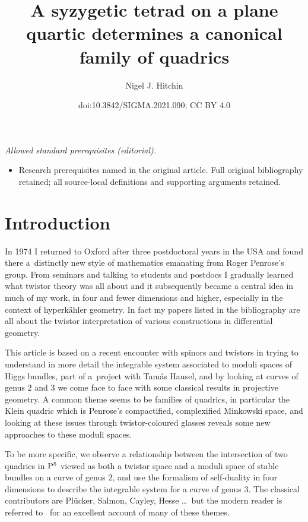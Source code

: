 \documentclass[10pt,a4paper]{amsart}
\title{A syzygetic tetrad on a plane quartic determines a canonical family of quadrics}
\author{Nigel J. Hitchin}
\date{doi:10.3842/SIGMA.2021.090; CC BY 4.0}
\numberwithin{equation}{section}
\begin{document}
\maketitle
\noindent\textit{Allowed standard prerequisites (editorial).}\begin{itemize}
\item Research prerequisites named in the original article. Full original bibliography retained; all source-local definitions and supporting arguments retained.
\end{itemize}\medskip
\section{Introduction}

In 1974 I returned to Oxford after three postdoctoral years in the USA and found there a~distinctly new style of mathematics emanating from Roger Penrose's group. From seminars and talking to students and postdocs I gradually learned what twistor theory was all about and it subsequently became a central idea
in much of my work, in four and fewer dimensions and higher, especially in the context of hyperk\"ahler geometry. In fact my papers listed in the bibliography \cite{Hitchin1979,Hitchin1981,Hitchin1982,Hitchin1982b,Hitchin1984,Hitchin1995,Hitchin1998,Hitchin2013, Hitchin2014, Hitchin2021,Hitchin/Karlhede/Lindstrom/Rocek} are all about the twistor interpretation of various constructions in differential geometry.

This article is based on a recent encounter with spinors and twistors in trying to understand in more detail the integrable system associated to moduli spaces of Higgs bundles, part of a~project with Tam\'as Hausel, and by looking at curves of genus $2$ and $3$ we come face to face with some classical results in projective geometry. A common theme seems to be families of quadrics, in particular the Klein quadric which is Penrose's compactified, complexified Minkowski space, and looking at these issues through twistor-coloured glasses reveals some new approaches to these moduli spaces.

To be more specific, we observe a relationship between the intersection of two quadrics in ${\rm P}^5$ viewed as both a twistor space and a moduli space of stable bundles on a curve of genus $2$, and use the formalism of self-duality in four dimensions to describe the integrable system for a curve of genus $3$.
The classical contributors are Pl\"ucker, Salmon, Cayley, Hesse \dots\ but the modern reader is referred to~\cite{Dolgachev} for an excellent account of many of these themes.
\end{document}
